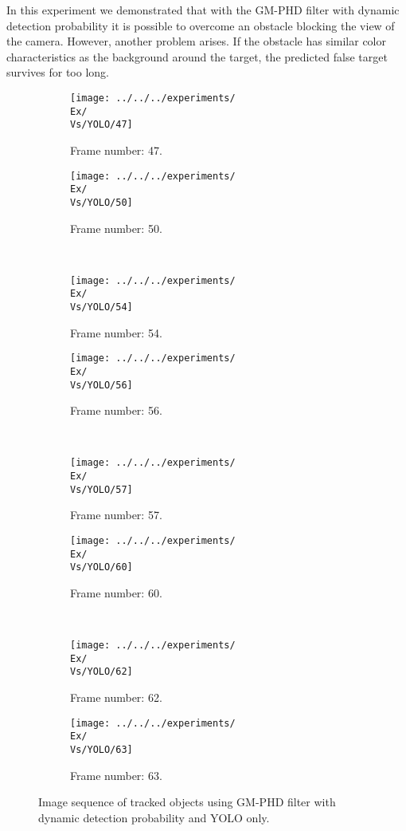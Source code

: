 In this experiment we demonstrated that with the GM-PHD filter with dynamic detection probability it is possible to overcome an obstacle blocking the view of the camera. However, another problem arises. If the obstacle has similar color characteristics as the background around the target, the predicted false target survives for too long.
\begin{figure}[H]
    \centering
    \begin{subfigure}{0.48\textwidth}
        \centering
        \texttt{[image: ../../../experiments/\\Ex/\\Vs/YOLO/47]}
        \caption{Frame number: 47.}
        \label{fig:\Ex-\Vs-\Set:01}
    \end{subfigure}
    \begin{subfigure}{0.48\textwidth}
        \centering
        \texttt{[image: ../../../experiments/\\Ex/\\Vs/YOLO/50]}
        \caption{Frame number: 50.}
        \label{fig:\Ex-\Vs-\Set:02}
    \end{subfigure}
    \\
    \begin{subfigure}{0.48\textwidth}
        \centering
        \texttt{[image: ../../../experiments/\\Ex/\\Vs/YOLO/54]}
        \caption{Frame number: 54.}
        \label{fig:\Ex-\Vs-\Set:03}
    \end{subfigure}
    \begin{subfigure}{0.48\textwidth}
        \centering
        \texttt{[image: ../../../experiments/\\Ex/\\Vs/YOLO/56]}
        \caption{Frame number: 56.}
        \label{fig:\Ex-\Vs-\Set:04}
    \end{subfigure}
    \\
    \begin{subfigure}{0.48\textwidth}
        \centering
        \texttt{[image: ../../../experiments/\\Ex/\\Vs/YOLO/57]}
        \caption{Frame number: 57.}
        \label{fig:\Ex-\Vs-\Set:05}
    \end{subfigure}
    \begin{subfigure}{0.48\textwidth}
        \centering
        \texttt{[image: ../../../experiments/\\Ex/\\Vs/YOLO/60]}
        \caption{Frame number: 60.}
        \label{fig:\Ex-\Vs-\Set:06}
    \end{subfigure}
    \\
    \begin{subfigure}{0.48\textwidth}
        \centering
        \texttt{[image: ../../../experiments/\\Ex/\\Vs/YOLO/62]}
        \caption{Frame number: 62.}
        \label{fig:\Ex-\Vs-\Set:07}
    \end{subfigure}
    \begin{subfigure}{0.48\textwidth}
        \centering
        \texttt{[image: ../../../experiments/\\Ex/\\Vs/YOLO/63]}
        \caption{Frame number: 63.}
        \label{fig:\Ex-\Vs-\Set:08}
    \end{subfigure}
    \caption{Image sequence of tracked objects using GM-PHD filter with dynamic detection probability and YOLO only.}
    \label{fig:\Ex-\Vs-\Set}
\end{figure}

